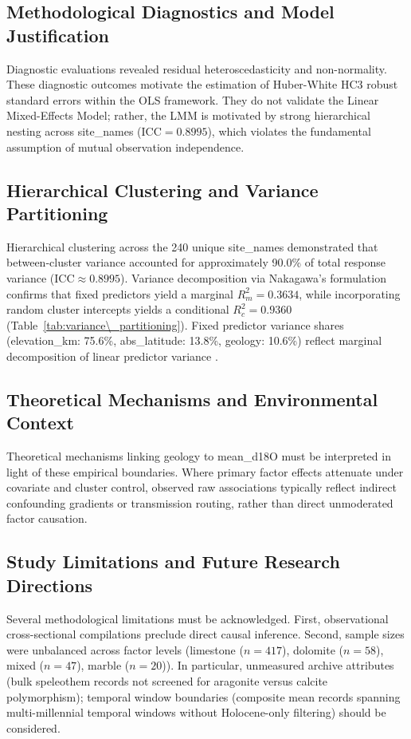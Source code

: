\documentclass[sn-basic,Numbered]{sn-jnl}%
\begin{document}
\subsection{Methodological Diagnostics and Model Justification}
Diagnostic evaluations revealed residual heteroscedasticity and non-normality. These diagnostic outcomes motivate the estimation of Huber-White HC3 robust standard errors within the OLS framework. They do not validate the Linear Mixed-Effects Model; rather, the LMM is motivated by strong hierarchical nesting across site\_names ($\text{ICC} = 0.8995$), which violates the fundamental assumption of mutual observation independence.

\subsection{Hierarchical Clustering and Variance Partitioning}
Hierarchical clustering across the 240 unique site\_names demonstrated that between-cluster variance accounted for approximately 90.0\% of total response variance ($\text{ICC} \approx 0.8995$). Variance decomposition via Nakagawa's formulation confirms that fixed predictors yield a marginal $R^2_m = 0.3634$, while incorporating random cluster intercepts yields a conditional $R^2_c = 0.9360$ (Table~\ref{tab:variance\_partitioning}). Fixed predictor variance shares (elevation\_km: 75.6\%, abs\_latitude: 13.8\%, geology: 10.6\%) reflect marginal decomposition of linear predictor variance \cite{nakagawa2013}.

\subsection{Theoretical Mechanisms and Environmental Context}
Theoretical mechanisms linking geology to mean\_d18O must be interpreted in light of these empirical boundaries. Where primary factor effects attenuate under covariate and cluster control, observed raw associations typically reflect indirect confounding gradients or transmission routing, rather than direct unmoderated factor causation.

\subsection{Study Limitations and Future Research Directions}
Several methodological limitations must be acknowledged. First, observational cross-sectional compilations preclude direct causal inference. Second, sample sizes were unbalanced across factor levels (limestone ($n = 417$), dolomite ($n = 58$), mixed ($n = 47$), marble ($n = 20$)). In particular, unmeasured archive attributes (bulk speleothem records not screened for aragonite versus calcite polymorphism); temporal window boundaries (composite mean records spanning multi-millennial temporal windows without Holocene-only filtering) should be considered.
\end{document}
